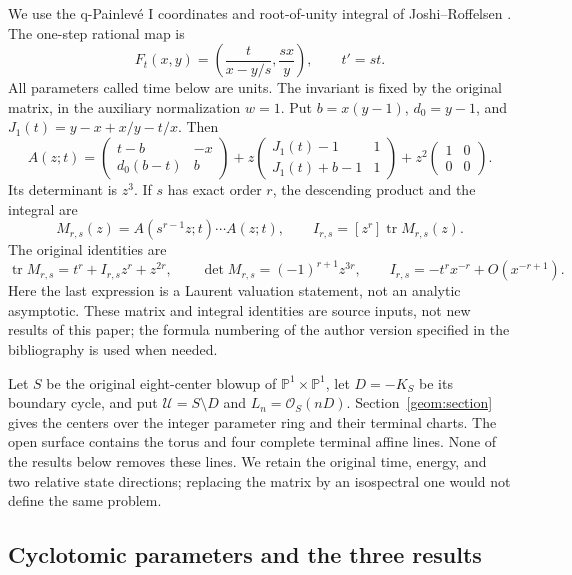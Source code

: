 We use the q-Painlev\'e I coordinates and root-of-unity integral of
Joshi--Roffelsen \cite{JoshiRoffelsen2026}. The one-step rational map is
\[
 F_t(x,y)=\left(\frac{t}{x-y/s},\frac{sx}{y}\right),\qquad t'=st.
\]
All parameters called time below are units. The invariant is fixed by
the original matrix, in the auxiliary normalization $w=1$.
Put $b=x(y-1)$, $d_0=y-1$, and $J_1(t)=y-x+x/y-t/x$. Then
\begin{equation}
 A(z;t)=
 \begin{pmatrix}t-b&-x\\d_0(b-t)&b\end{pmatrix}
 +z\begin{pmatrix}J_1(t)-1&1\\J_1(t)+b-1&1\end{pmatrix}
 +z^2\begin{pmatrix}1&0\\0&0\end{pmatrix}.
 \label{main:matrix}
\end{equation}
Its determinant is $z^3$. If $s$ has exact order $r$, the descending
product and the integral are
\begin{equation}
 M_{r,s}(z)=A(s^{r-1}z;t)\cdots A(z;t),\qquad
 I_{r,s}=[z^r]\operatorname{tr}M_{r,s}(z).
 \label{main:integral}
\end{equation}
The original identities are
\begin{equation}
 \operatorname{tr}M_{r,s}=t^r+I_{r,s}z^r+z^{2r},\qquad
 \det M_{r,s}=(-1)^{r+1}z^{3r},\qquad
 I_{r,s}=-t^r x^{-r}+O(x^{-r+1}).
 \label{main:original-identities}
\end{equation}
Here the last expression is a Laurent valuation statement, not an
analytic asymptotic. These matrix and integral identities are source
inputs, not new results of this paper; the formula numbering of the
author version specified in the bibliography is used when needed.

Let $S$ be the original eight-center blowup of
$\mathbb P^1\times\mathbb P^1$, let $D=-K_S$ be its boundary cycle,
and put $\mathcal U=S\setminus D$ and $L_n=\mathcal O_S(nD)$.
Section~\ref{geom:section}
gives the centers over the integer parameter ring and their terminal
charts. The open surface contains the torus and four complete terminal
affine lines. None of the results below removes these lines. We retain
the original time, energy, and two relative state directions; replacing
the matrix by an isospectral one would not define the same problem.

\subsection{Cyclotomic parameters and the three results}

